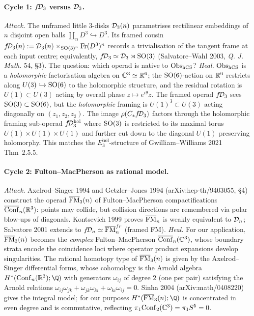 \paragraph{Cycle 1: $f\!\mathcal{D}_3$ versus $\mathcal{D}_3$.}
\emph{Attack.} The unframed little $3$-disks $\mathcal{D}_3(n)$
parametrises rectilinear embeddings of $n$ disjoint open balls
$\coprod_n D^3 \hookrightarrow D^3$. Its framed cousin
$f\!\mathcal{D}_3(n) := \mathcal{D}_3(n) \times_{\mathrm{SO}(3)^n} \mathrm{Fr}(D^3)^n$
records a trivialisation of the tangent frame at each input
centre; equivalently, $f\!\mathcal{D}_3 \simeq \mathcal{D}_3 \rtimes \mathrm{SO}(3)$
(Salvatore--Wahl 2003, \emph{Q. J. Math.} 54, \S3). The question:
which operad is native to $\mathrm{Obs}_{\mathrm{hCS}}$?
\emph{Heal.} $\mathrm{Obs}_{\mathrm{hCS}}$ is a \emph{holomorphic} factorisation
algebra on $\mathbb{C}^3 \simeq \mathbb{R}^6$; the $\mathrm{SO}(6)$-action on $\mathbb{R}^6$
restricts along $U(3) \hookrightarrow \mathrm{SO}(6)$ to the holomorphic
structure, and the residual rotation is $U(1) \subset U(3)$ acting
by overall phase $z \mapsto e^{i\theta} z$. The framed operad
$f\!\mathcal{D}_3$ sees $\mathrm{SO}(3) \subset \mathrm{SO}(6)$, but the \emph{holomorphic}
framing is $U(1)^3 \subset U(3)$ acting diagonally on $(z_1,z_2,z_3)$.
The image $\rho(C_*f\!\mathcal{D}_3)$ factors through the holomorphic
framing sub-operad $f\!\mathcal{D}_3^{\mathrm{hol}}$ where $\mathrm{SO}(3)$ is
restricted to its maximal torus $U(1) \times U(1) \times U(1)$ and
further cut down to the diagonal $U(1)$ preserving holomorphy.
This matches the $E_3^{\mathrm{hol}}$-structure of
Gwilliam--Williams 2021 Thm~2.5.5.

\paragraph{Cycle 2: Fulton--MacPherson as rational model.}
\emph{Attack.} Axelrod--Singer 1994 and Getzler--Jones 1994
(arXiv:hep-th/9403055, \S4) construct the operad $\overline{\mathrm{FM}}_3(n)$ of
Fulton--MacPherson compactifications $\overline{\mathrm{Conf}}_n(\mathbb{R}^3)$:
points may collide, but collision directions are remembered via
polar blow-ups of diagonals. Kontsevich 1999 proves $\overline{\mathrm{FM}}_n$ is
weakly equivalent to $\mathcal{D}_n$; Salvatore 2001 extends to
$f\!\mathcal{D}_n \simeq \overline{\mathrm{FM}}_n^{fr}$ (framed FM).
\emph{Heal.} For our application, $\overline{\mathrm{FM}}_3(n)$ becomes the
\emph{complex} Fulton--MacPherson $\overline{\mathrm{Conf}}_n(\mathbb{C}^3)$,
whose boundary strata encode the coincidence loci where operator
product expansions develop singularities. The rational homotopy
type of $\overline{\mathrm{FM}}_3(n)$ is given by the Axelrod--Singer differential
forms, whose cohomology is the Arnold algebra
$H^*(\Conf_n(\R^3);\Q)$ with generators $\omega_{ij}$ of degree
$2$ (one per pair) satisfying the Arnold relations
$\omega_{ij}\omega_{jk} + \omega_{jk}\omega_{ki} +
\omega_{ki}\omega_{ij} = 0$.  Sinha 2004 (arXiv:math/0408220)
gives the integral model; for our purposes
$H^*(\FM_3(n);\Q)$ is concentrated in even degree and is
commutative, reflecting $\pi_1\mathrm{Conf}_2(\mathbb{C}^3) = \pi_1 S^5 = 0$.

